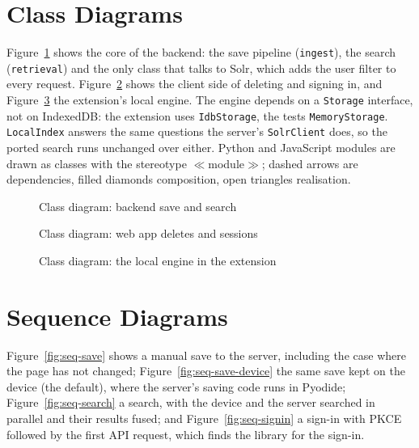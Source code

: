 \section{Class Diagrams}

Figure~\ref{fig:class-backend} shows the core of the backend: the save
pipeline (\texttt{ingest}), the search (\texttt{retrieval}) and the only class
that talks to Solr, which adds the user filter to every request.
Figure~\ref{fig:class-client} shows the client side of deleting and signing
in, and Figure~\ref{fig:class-engine} the extension's local engine. The engine
depends on a \texttt{Storage} interface, not on IndexedDB: the extension uses
\texttt{IdbStorage}, the tests \texttt{MemoryStorage}. \texttt{LocalIndex}
answers the same questions the server's \texttt{SolrClient} does, so the
ported search runs unchanged over either. Python and JavaScript modules are
drawn as classes with the stereotype $\ll$module$\gg$; dashed arrows are
dependencies, filled diamonds composition, open triangles realisation.

\begin{figure}[H]
\centering

\caption{Class diagram: backend save and search}
\label{fig:class-backend}
\end{figure}

\begin{figure}[H]
\centering

\caption{Class diagram: web app deletes and sessions}
\label{fig:class-client}
\end{figure}

\begin{figure}[H]
\centering

\caption{Class diagram: the local engine in the extension}
\label{fig:class-engine}
\end{figure}

\section{Sequence Diagrams}

Figure~\ref{fig:seq-save} shows a manual save to the server, including the
case where the page has not changed; Figure~\ref{fig:seq-save-device} the same
save kept on the device (the default), where the server's saving code runs in
Pyodide; Figure~\ref{fig:seq-search} a search, with the device and the server
searched in parallel and their results fused; and Figure~\ref{fig:seq-signin} a
sign-in with PKCE followed by the first API request, which finds the library
for the sign-in.

